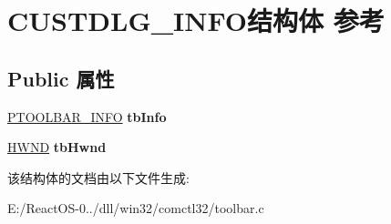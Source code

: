 \hypertarget{struct_c_u_s_t_d_l_g___i_n_f_o}{}\section{C\+U\+S\+T\+D\+L\+G\+\_\+\+I\+N\+F\+O结构体 参考}
\label{struct_c_u_s_t_d_l_g___i_n_f_o}
\subsection*{Public 属性}
\begin{DoxyCompactItemize}
\item 
\mbox{\label{struct_c_u_s_t_d_l_g___i_n_f_o_a6c5445ec5574b2f6e35927a45fb9e010}} 
\hyperlink{struct_t_o_o_l_b_a_r___i_n_f_o}{P\+T\+O\+O\+L\+B\+A\+R\+\_\+\+I\+N\+FO} {\bfseries tb\+Info}
\item 
\mbox{\label{struct_c_u_s_t_d_l_g___i_n_f_o_a815e648fbe3f9a0838d12d44c579c4f2}} 
\hyperlink{interfacevoid}{H\+W\+ND} {\bfseries tb\+Hwnd}
\end{DoxyCompactItemize}


该结构体的文档由以下文件生成\+:\begin{DoxyCompactItemize}
\item 
E\+:/\+React\+O\+S-\/0../dll/win32/comctl32/toolbar.\+c\end{DoxyCompactItemize}
